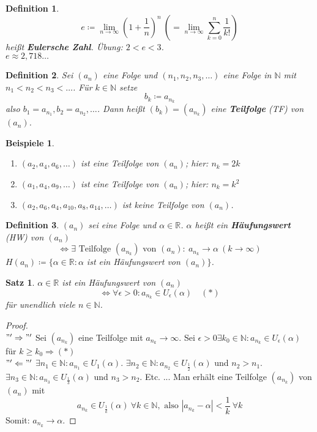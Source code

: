 \documentclass[titlepage,ngerman,a4paper,headsepline,DIV15,halfparskip*,14pt]{scrartcl}
\newcommand{\R}{\mathbb{R}}
\newcommand{\N}{\mathbb{N}}
\theoremstyle{dotless}
\newtheorem{satz}{Satz}[section]
\newtheorem*{definition}{Definition}
\newtheorem*{beispiele}{Beispiele}
\begin{document}
\begin{definition} 
	$$
		e \coloneqq \lim_{n \rightarrow \infty} \left( 1 + \frac{1}{n} \right)^{n} ~( = \lim_{n \rightarrow \infty} \sum_{k = 0}^{n} \frac{1}{k!} )
	$$
	hei{\ss}t \textbf{Eulersche Zahl}. Übung: $2 < e < 3$. \\
	$e \approx 2,718\dotsc$
\end{definition}

\begin{definition} 
	Sei $(a_{n})$ eine Folge und $(n_{1}, n_{2}, n_{3}, \dotsc)$ eine Folge in $\N$ mit \\
	$n_{1} < n_{2} < n_{3} < \dotsc$. Für $k \in \N$ setze
	$$
		b_{k} \coloneqq a_{n_{k}}
	$$
	also $b_{1} = a_{n_{1}}, b_{2} = a_{n_{2}}, \dotsc$. Dann hei{\ss}t $(b_{k}) = (a_{n_{k}})$ eine \textbf{Teilfolge} (TF) von $(a_{n})$.
\end{definition}


\begin{beispiele}\
	\begin{enumerate}
		\item $(a_{2}, a_{4}, a_{6}, \dotsc)$ ist eine Teilfolge von $(a_{n})$; hier: $n_{k} = 2k$
		\item $(a_{1}, a_{4}, a_{9}, \dotsc)$ ist eine Teilfolge von $(a_{n})$; hier: $n_{k} = k^2$
		\item $(a_{2}, a_{6}, a_{4}, a_{10}, a_{8}, a_{14}, \dotsc)$ ist keine Teilfolge von $(a_{n})$.
	\end{enumerate}
\end{beispiele}


\begin{definition}
	$(a_{n})$ sei eine Folge und $\alpha \in \R$. $\alpha$ hei{\ss}t ein \textbf{Häufungswert} (HW) von $(a_{n})$
	$$
		\iff \exists \text{ Teilfolge } (a_{n_{k}}) \text{ von } (a_{n}) : ~a_{n_{k}} \rightarrow \alpha ~(k \rightarrow \infty) 
	$$	
	$H(a_{n}) \coloneqq \{ \alpha \in \R: \alpha$ ist ein Häufungswert von $(a_{n}) \}$.
\end{definition}


\begin{satz} \label{satz:2.10}
	$\alpha \in \R$ ist ein Häufungswert von $(a_{n})$
	$$
		\iff \forall \epsilon > 0: a_{n_{k}} \in U_{\epsilon}(\alpha) \quad (*)
	$$
	für unendlich viele $n \in \N$.
\end{satz}

\begin{proof} ~\\
	$"'\Rightarrow"'$ Sei $(a_{n_{k}})$ eine Teilfolge mit $a_{n_{k}} \rightarrow \infty$. Sei $\epsilon > 0 \exists k_{0} \in \N: a_{n_{k}} \in U_{\epsilon}(\alpha)$ für $k \geq k_{0} \Rightarrow (*)$ \\
	$"'\Leftarrow"'$ $\exists n_{1} \in \N: a_{n_{1}} \in U_{1}(\alpha)$. $\exists n_{2} \in \N: a_{n_{2}} \in U_{\frac{1}{2}}(\alpha)$ und $n_{2} > n_{1}$. $\exists n_{3} \in \N: a_{n_{3}} \in U_{\frac{1}{3}}(\alpha)$ und $n_{3} > n_{2}$. Etc. ... Man erhält eine Teilfolge $(a_{n_{k}})$ von $(a_{n})$ mit
	$$
		a_{n_{k}} \in U_{\frac{1}{k}}(\alpha) ~\forall k \in \N, \text{ also } |a_{n_{k}} - \alpha| < \frac{1}{k} ~\forall k
	$$
	Somit: $a_{n_{k}} \rightarrow \alpha$. 
\end{proof}
\end{document}
